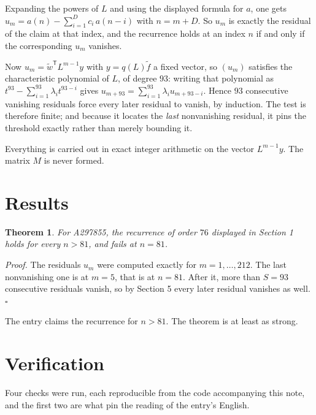 \documentclass[11pt]{article}
\newtheorem{theorem}{Theorem}
\theoremstyle{definition}
\begin{document}
Expanding the powers of $L$ and using the displayed formula for $a$, one gets $u_m = a(n) - \sum_{i=1}^{D} c_i\,a(n-i)$ with $n = m + D$. So $u_m$ is exactly the residual of the claim at that index, and the recurrence holds at an index $n$ if and only if the corresponding $u_m$ vanishes.

Now $u_m = \tilde w^{\mathsf T} L^{m-1} y$ with $y = q(L)\tilde f$ a fixed vector, so $(u_m)$ satisfies the characteristic polynomial of $L$, of degree $93$: writing that polynomial as $t^{93} - \sum_{i=1}^{93} \lambda_i t^{93-i}$ gives $u_{m+93} = \sum_{i=1}^{93} \lambda_i u_{m+93-i}$. Hence $93$ consecutive vanishing residuals force every later residual to vanish, by induction. The test is therefore finite; and because it locates the {\itshape last} nonvanishing residual, it pins the threshold exactly rather than merely bounding it.

Everything is carried out in exact integer arithmetic on the vector $L^{m-1}y$. The matrix $M$ is never formed.

\section{Results}

\begin{theorem} For A297855, the recurrence of order $76$ displayed in Section 1 holds for every $n > 81$, and fails at $n = 81$.\end{theorem}

{\itshape Proof.} The residuals $u_m$ were computed exactly for $m = 1,\dots,212$. The last nonvanishing one is at $m = 5$, that is at $n = 81$. After it, more than $S = 93$ consecutive residuals vanish, so by Section 5 every later residual vanishes as well. $\square$

The entry claims the recurrence for $n > 81$. The theorem is at least as strong.

\section{Verification}

Four checks were run, each reproducible from the code accompanying this note, and the first two are what pin the reading of the entry's English.
\end{document}
